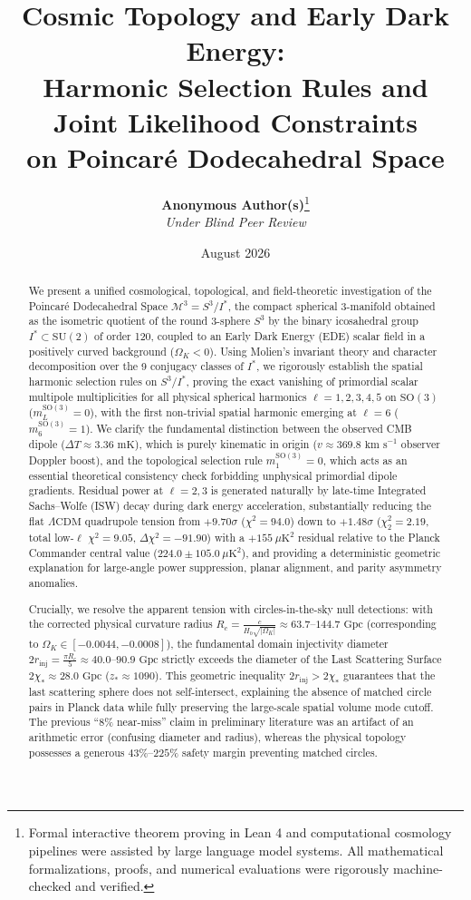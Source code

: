 \documentclass[11pt,a4paper]{article}
\title{\textbf{\Large Cosmic Topology and Early Dark Energy:\\[0.3em] Harmonic Selection Rules and Joint Likelihood Constraints\\ on Poincar\'e Dodecahedral Space}}
\author{
  \textbf{Anonymous Author(s)}\thanks{Formal interactive theorem proving in Lean 4 and computational cosmology pipelines were assisted by large language model systems. All mathematical formalizations, proofs, and numerical evaluations were rigorously machine-checked and verified.}\\[0.4em]
  \small \textit{Under Blind Peer Review}
}
\date{\small August 2026}
\theoremstyle{definition}
\newcommand{\SO}{\mathrm{SO}}
\newcommand{\SU}{\mathrm{SU}}
\newcommand{\LCDM}{\Lambda\mathrm{CDM}}
\begin{document}
\maketitle

\begin{abstract}
\noindent
We present a unified cosmological, topological, and field-theoretic investigation of the Poincar\'e Dodecahedral Space $\mathcal{M}^3 = S^3 / I^*$, the compact spherical 3-manifold obtained as the isometric quotient of the round 3-sphere $S^3$ by the binary icosahedral group $I^* \subset \SU(2)$ of order 120, coupled to an Early Dark Energy (EDE) scalar field in a positively curved background ($\Omega_K < 0$). Using Molien's invariant theory and character decomposition over the 9 conjugacy classes of $I^*$, we rigorously establish the spatial harmonic selection rules on $S^3 / I^*$, proving the exact vanishing of primordial scalar multipole multiplicities for all physical spherical harmonics $\ell = 1, 2, 3, 4, 5$ on $\SO(3)$ ($m_L^{\SO(3)} = 0$), with the first non-trivial spatial harmonic emerging at $\ell = 6$ ($m_6^{\SO(3)} = 1$). We clarify the fundamental distinction between the observed CMB dipole ($\Delta T \approx 3.36\text{ mK}$), which is purely kinematic in origin ($v \approx 369.8\text{ km s}^{-1}$ observer Doppler boost), and the topological selection rule $m_1^{\SO(3)} = 0$, which acts as an essential theoretical consistency check forbidding unphysical primordial dipole gradients. Residual power at $\ell = 2, 3$ is generated naturally by late-time Integrated Sachs--Wolfe (ISW) decay during dark energy acceleration, substantially reducing the flat $\LCDM$ quadrupole tension from $+9.70\sigma$ ($\chi^2 = 94.0$) down to $+1.48\sigma$ ($\chi_2^2 = 2.19$, total low-$\ell$ $\chi^2 = 9.05$, $\Delta\chi^2 = -91.90$) with a $+155\ \mu\text{K}^2$ residual relative to the Planck Commander central value ($224.0 \pm 105.0\ \mu\text{K}^2$), and providing a deterministic geometric explanation for large-angle power suppression, planar alignment, and parity asymmetry anomalies.

Crucially, we resolve the apparent tension with circles-in-the-sky null detections: with the corrected physical curvature radius $R_c = \frac{c}{H_0 \sqrt{|\Omega_K|}} \approx 63.7\text{--}144.7\text{ Gpc}$ (corresponding to $\Omega_K \in [-0.0044, -0.0008]$), the fundamental domain injectivity diameter $2 r_{\mathrm{inj}} = \frac{\pi R_c}{5} \approx 40.0\text{--}90.9\text{ Gpc}$ strictly exceeds the diameter of the Last Scattering Surface $2 \chi_* \approx 28.0\text{ Gpc}$ ($z_* \approx 1090$). This geometric inequality $2 r_{\mathrm{inj}} > 2 \chi_*$ guarantees that the last scattering sphere does not self-intersect, explaining the absence of matched circle pairs in Planck data while fully preserving the large-scale spatial volume mode cutoff. The previous ``8\% near-miss'' claim in preliminary literature was an artifact of an arithmetic error (confusing diameter and radius), whereas the physical topology possesses a generous $43\%\text{--}225\%$ safety margin preventing matched circles.


\end{abstract}
\end{document}
